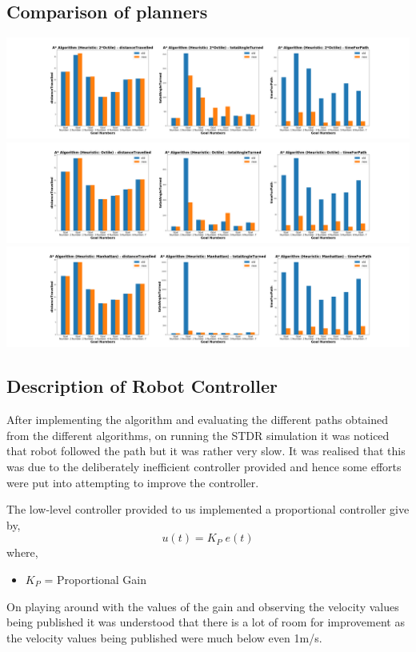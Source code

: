 \documentclass[a4paper,12pt]{article}
\begin{document}
		\subsection{Comparison of planners}
		\includegraphics[scale=0.3]{images/compare_robot_A_Algorithm_Heuristic_2Octile.png}
		\includegraphics[scale=0.3]{images/compare_robot_A_Algorithm_Heuristic_Octile.png}
		\includegraphics[scale=0.3]{images/compare_robot_A_Algorithm_Heuristic_Manhattan.png}
		\subsection{Description of Robot Controller}
		After implementing the algorithm and evaluating the different paths obtained from the different algorithms, on running the STDR simulation it was noticed that robot followed the path but it was rather very slow. It was realised that this was due to the deliberately inefficient controller provided and hence some efforts were put into attempting to improve the controller.
		
		The low-level controller provided to us implemented a proportional controller give by,
		\begin{equation}
		u(t)=K_P \; e(t)
		\end{equation}
		where,
		\begin{itemize}
			\item $K_P$ = Proportional Gain
		\end{itemize}
		On playing around with the values of the gain and observing the velocity values being published it was understood that there is a lot of room for improvement as the velocity values being published were much below even 1m/s. 
		
\end{document}
